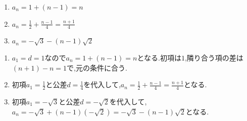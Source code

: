 \noindent{}\par\nobreak
\begin{enumerate}[label=(\arabic*),parsep=3pt,format=\bookitemlink{example-arithmetic-1}{answer}{solution}]
  \item $a_n=1+(n-1)=n$
  \item $a_n=\frac12+\frac{n-1}{4}
      =\frac{n+1}{4}$
  \item $a_n=-\sqrt3-(n-1)\sqrt2$
\end{enumerate}

\noindent{}\par\nobreak
\begin{enumerate}[label=(\arabic*),parsep=3pt,format=\bookitemlink{example-arithmetic-1}{solution}{problem}]
  \item $a_1=d=1$なので$a_n=1+(n-1)=n$となる.初項は$1$,隣り合う項の差は$(n+1)-n=1$で,元の条件に合う.
  \item 初項$a_1=\frac12$と公差$d=\frac14$を代入して,$a_n=\frac12+\frac{n-1}{4}=\frac{n+1}{4}$となる.
  \item 初項$a_1=-\sqrt3$と公差$d=-\sqrt2$を代入して,$a_n=-\sqrt3+(n-1)(-\sqrt2)=-\sqrt3-(n-1)\sqrt2$となる.
\end{enumerate}
